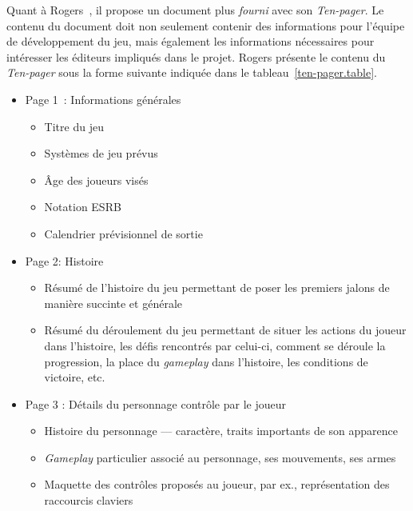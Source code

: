 Quant \`a Rogers~\cite{LevelUpRogers2014}, il  propose un document plus \emph{fourni} avec son \emph{Ten-pager}.
Le contenu du document doit non seulement contenir des informations pour l'équipe de développement du jeu, mais également les informations nécessaires pour int\'eresser les éditeurs impliqués dans le projet.
Rogers présente le contenu du \emph{Ten-pager} sous la forme suivante indiqu\'ee dans le tableau~\ref{ten-pager.table}.
%
    

\begin{table}[H]
\footnotesize
\begin{framed}
\begin{itemize}
    \item Page 1~: Informations générales
    \begin{itemize}
        \item Titre du jeu
        \item Systèmes de jeu prévus
        \item \^Age des joueurs visés
        \item Notation ESRB
        \item Calendrier prévisionnel de sortie
    \end{itemize}
    \item Page 2: Histoire
    \begin{itemize}
        \item  Résumé de l'histoire du jeu permettant de poser les premiers jalons de manière succinte et générale
        \item Résumé du déroulement du jeu  permettant de situer les actions du joueur dans l'histoire, les d\'efis rencontrés par celui-ci, comment se déroule la progression, la place du \emph{gameplay} dans l'histoire, les conditions de victoire, etc.
    \end{itemize}
    \item Page 3 : Détails du personnage contr\^ole par le joueur
    \begin{itemize}
        \item Histoire du personnage --- caractère, traits importants de son apparence
        \item \emph{Gameplay} particulier associé au personnage, ses mouvements, ses armes
        \item Maquette des contrôles proposés au joueur, par ex., représentation des raccourcis claviers

\end{itemize}
\end{itemize}
\end{framed}
\end{table}
